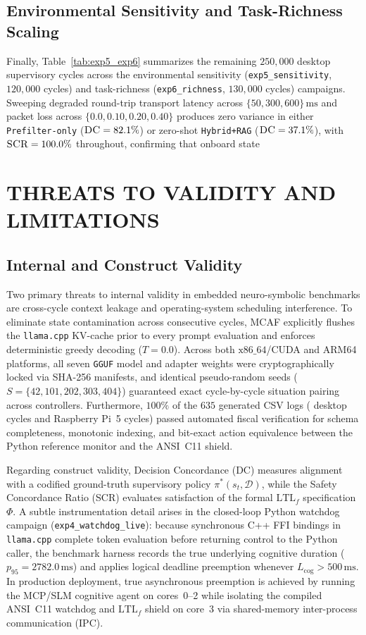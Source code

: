 \documentclass{ieeeaccess}
\begin{document}
\subsection{Environmental Sensitivity and Task-Richness Scaling}
Finally, Table~\ref{tab:exp5_exp6} summarizes the remaining $250{,}000$ desktop supervisory cycles across the environmental sensitivity (\texttt{exp5\_sensitivity}, $120{,}000$ cycles) and task-richness (\texttt{exp6\_richness}, $130{,}000$ cycles) campaigns. Sweeping degraded round-trip transport latency across $\{50, 300, 600\}\,\text{ms}$ and packet loss across $\{0.0, 0.10, 0.20, 0.40\}$ produces zero variance in either \texttt{Prefilter-only} ($\textsc{DC} = 82.1\%$) or zero-shot \texttt{Hybrid+RAG} ($\textsc{DC} = 37.1\%$), with $\textsc{SCR} = 100.0\%$ throughout, confirming that onboard state

\section{THREATS TO VALIDITY AND LIMITATIONS}
\label{sec:threats}

\subsection{Internal and Construct Validity}
Two primary threats to internal validity in embedded neuro-symbolic benchmarks are cross-cycle context leakage and operating-system scheduling interference. To eliminate state contamination across consecutive cycles, MCAF explicitly flushes the \texttt{llama.cpp} KV-cache prior to every prompt evaluation and enforces deterministic greedy decoding ($T = 0.0$). Across both $\text{x86\_64}$/CUDA and ARM64 platforms, all seven \texttt{GGUF} model and adapter weights were cryptographically locked via SHA-256 manifests, and identical pseudo-random seeds ($S = \{42, 101, 202, 303, 404\}$) guaranteed exact cycle-by-cycle situation pairing across controllers. Furthermore, $100\%$ of the $635$ generated CSV logs ({\TotalDesktopCycles} desktop cycles and {\TotalPiCycles} Raspberry Pi~5 cycles) passed automated fiscal verification for schema completeness, monotonic indexing, and bit-exact action equivalence between the Python reference monitor and the ANSI~C11 shield.

Regarding construct validity, Decision Concordance (\textsc{DC}) measures alignment with a codified ground-truth supervisory policy $\pi^*(s_t, \mathcal{D})$, while the Safety Concordance Ratio (\textsc{SCR}) evaluates satisfaction of the formal $\mathrm{LTL}_f$ specification $\Phi$. A subtle instrumentation detail arises in the closed-loop Python watchdog campaign (\texttt{exp4\_watchdog\_live}): because synchronous C++ FFI bindings in \texttt{llama.cpp} complete token evaluation before returning control to the Python caller, the benchmark harness records the true underlying cognitive duration ($p_{95} = 2782.0\,\text{ms}$) and applies logical deadline preemption whenever $L_{\mathrm{cog}} > 500\,\text{ms}$. In production deployment, true asynchronous preemption is achieved by running the MCP/SLM cognitive agent on cores~0--2 while isolating the compiled ANSI~C11 watchdog and $\mathrm{LTL}_f$ shield on core~3 via shared-memory inter-process communication (IPC).
\end{document}
